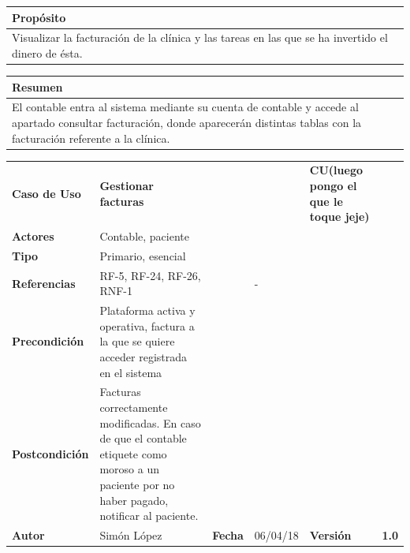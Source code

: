 \documentclass[11pt,a4paper]{article}
\begin{document}
\begin{table}[h]
	\centering
	\begin{tabular}{l}
		\hline
		\multicolumn{1}{|l|}{Propósito} \\ \hline
		Visualizar la facturación de la clínica y las tareas en las que se ha invertido el dinero de ésta.
	\end{tabular}
\end{table}

\begin{table}[H]
	\centering
	\begin{tabular}{l}
		\hline
		\multicolumn{1}{|l|}{Resumen} \\ \hline
		El contable entra al sistema mediante su cuenta de contable y accede al apartado consultar facturación, donde aparecerán distintas tablas con la facturación referente a la clínica.
	\end{tabular}
\end{table}





\begin{table}[H]
	\centering
	\begin{tabular}{|l|lllll}
		\cline{1-1} \cline{6-6}
		\textbf{Caso de Uso}   & \textbf{Gestionar facturas} &   &  & \multicolumn{1}{l|}{\textbf{\textbf{CU(luego pongo el que le toque jeje)}}}        & \multicolumn{1}{l|}{\textbf{}} \\ \cline{1-1} \cline{6-6} 
		\textbf{Actores}       & Contable, paciente &                                     &                       &                                       & \textbf{}                      \\ \cline{1-1}
		\textbf{Tipo}          & Primario, esencial  &                                     &                       &                                       & \textbf{}                      \\ \cline{1-1}
		\textbf{Referencias}   & RF-5, RF-24, RF-26, RNF-1                         &     & -                     &                                       & \textbf{}                      \\ \cline{1-1}
		\textbf{Precondición}  & Plataforma activa y operativa, factura a la que se quiere acceder registrada en el sistema         &                      &                & \textbf{}                      \\ \cline{1-1}
		\textbf{Postcondición} & Facturas correctamente modificadas. En caso de que el contable etiquete como moroso a un paciente por no haber pagado, notificar al paciente.     &      &      &       &         \\ \cline{1-1} \cline{3-3} \cline{5-5}
		\textbf{Autor}         & \multicolumn{1}{l|}{Simón López} & \multicolumn{1}{l|}{\textbf{Fecha}} & \multicolumn{1}{l|}{06/04/18} & \multicolumn{1}{l|}{\textbf{Versión}} & \textbf{1.0}                      \\ \cline{1-1} \cline{3-3} \cline{5-5}
	\end{tabular}
\end{table}
\end{document}
